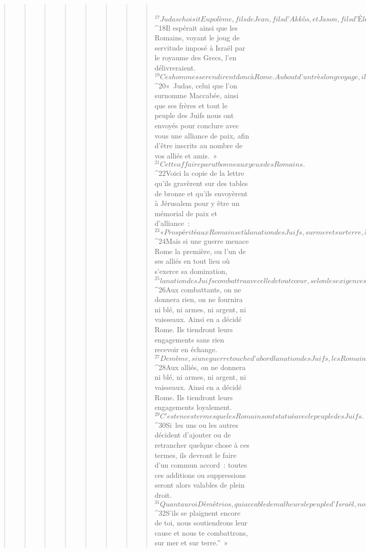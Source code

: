 \begin{verse}
\begin{verse}
\begin{verse}
\begin{verse}
\begin{verse}
\begin{verse}
\begin{verse}
\begin{verse}
         
${}^{17}Judas choisit Eupolème, fils de Jean, fils d’Akkôs, et Jason, fils d’Éléazar ; il les envoya à Rome pour conclure amitié et alliance. 
${}^{18}Il espérait ainsi que les Romains, voyant le joug de servitude imposé à Israël par le royaume des Grecs, l’en délivreraient. 
${}^{19}Ces hommes se rendirent donc à Rome. Au bout d’un très long voyage, ils entrèrent au Sénat et prirent la parole. Ils dirent : 
${}^{20}« Judas, celui que l’on surnomme Maccabée, ainsi que ses frères et tout le peuple des Juifs nous ont envoyés pour conclure avec vous une alliance de paix, afin d’être inscrits au nombre de vos alliés et amis. » 
${}^{21}Cette affaire parut bonne aux yeux des Romains. 
${}^{22}Voici la copie de la lettre qu’ils gravèrent sur des tables de bronze et qu’ils envoyèrent à Jérusalem pour y être un mémorial de paix et d’alliance : 
${}^{23}« Prospérité aux Romains et à la nation des Juifs, sur mer et sur terre, à jamais ! Loin d’eux l’épée et l’ennemi ! 
${}^{24}Mais si une guerre menace Rome la première, ou l’un de ses alliés en tout lieu où s’exerce sa domination, 
${}^{25}la nation des Juifs combattra avec elle de tout cœur, selon les exigences du moment. 
${}^{26}Aux combattants, on ne donnera rien, on ne fournira ni blé, ni armes, ni argent, ni vaisseaux. Ainsi en a décidé Rome. Ils tiendront leurs engagements sans rien recevoir en échange. 
${}^{27}De même, si une guerre touche d’abord la nation des Juifs, les Romains combattront avec elle de toute leur âme, selon les exigences du moment. 
${}^{28}Aux alliés, on ne donnera ni blé, ni armes, ni argent, ni vaisseaux. Ainsi en a décidé Rome. Ils tiendront leurs engagements loyalement. 
${}^{29}C’est en ces termes que les Romains ont statué avec le peuple des Juifs. 
${}^{30}Si les uns ou les autres décident d’ajouter ou de retrancher quelque chose à ces termes, ils devront le faire d’un commun accord : toutes ces additions ou suppressions seront alors valables de plein droit. 
${}^{31}Quant au roi Démétrios, qui accable de malheurs le peuple d’Israël, nous lui avons écrit en ces termes : “Pourquoi fais-tu peser ton joug sur les Juifs, nos amis et alliés ? 
${}^{32}S’ils se plaignent encore de toi, nous soutiendrons leur cause et nous te combattrons, sur mer et sur terre.” »
      

\end{verse}
\end{verse}
\end{verse}
\end{verse}
\end{verse}
\end{verse}
\end{verse}
\end{verse}
